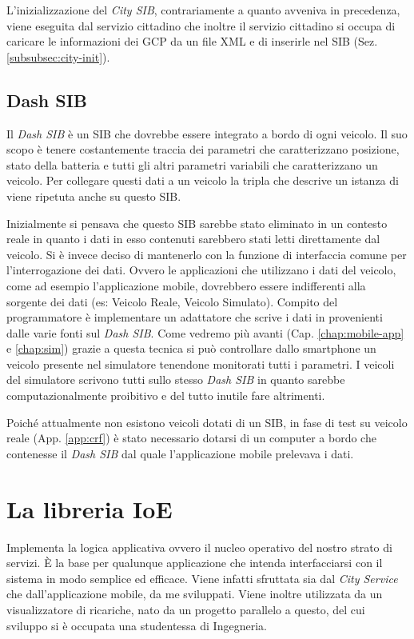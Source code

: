 L'inizializzazione del \emph{City SIB}, contrariamente a quanto avveniva in precedenza, viene eseguita dal servizio cittadino che inoltre il servizio cittadino si occupa di caricare le informazioni dei GCP da un file XML e di inserirle nel SIB (Sez. \ref{subsubsec:city-init}).

\subsection{Dash SIB}\label{subsec:dash-sib}

Il \emph{Dash SIB} è  un SIB che dovrebbe essere integrato a bordo di ogni veicolo. Il suo scopo è tenere costantemente traccia dei parametri che caratterizzano posizione, stato della batteria e tutti gli altri parametri variabili che caratterizzano un veicolo. Per collegare questi dati a un veicolo la tripla che descrive un istanza di  viene ripetuta anche su questo SIB. 

Inizialmente si pensava che questo SIB sarebbe stato eliminato in un contesto reale in quanto i dati in esso contenuti sarebbero stati letti direttamente dal veicolo. Si è invece deciso di mantenerlo con la funzione di interfaccia comune per l'interrogazione dei dati. Ovvero le applicazioni che utilizzano i dati del veicolo, come ad esempio l'applicazione mobile, dovrebbero essere indifferenti alla sorgente dei dati (es: Veicolo Reale, Veicolo Simulato). Compito del programmatore è implementare un adattatore che scrive i dati in provenienti dalle varie fonti sul \emph{Dash SIB}. Come vedremo più avanti (Cap. \ref{chap:mobile-app} e \ref{chap:sim}) grazie a questa tecnica si può controllare dallo smartphone un veicolo presente nel simulatore tenendone monitorati tutti i parametri. I veicoli del simulatore scrivono tutti sullo stesso \emph{Dash SIB} in quanto sarebbe computazionalmente proibitivo e del tutto inutile fare altrimenti.

Poiché attualmente non esistono veicoli dotati di un SIB, in fase di test su veicolo reale (App. \ref{app:crf}) è stato necessario dotarsi di un computer a bordo che contenesse il \emph{Dash SIB} dal quale l'applicazione mobile prelevava i dati.

\section{La libreria IoE}\label{subsec:ioe-lib}

Implementa la logica applicativa ovvero il nucleo operativo del nostro strato di servizi. È la base per qualunque applicazione che intenda interfacciarsi con il sistema in modo semplice ed efficace. Viene infatti sfruttata sia dal \emph{City Service} che dall'applicazione mobile, da me sviluppati. Viene inoltre utilizzata da un visualizzatore di ricariche, nato da un progetto parallelo a questo, del cui sviluppo si è occupata una studentessa di Ingegneria.

